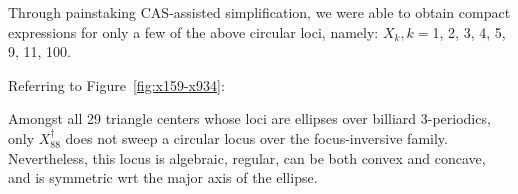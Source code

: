 Through painstaking CAS-assisted simplification, we were able to obtain compact expressions for only a few of the above circular loci, namely: $X_k,k=$1, 2, 3, 4, 5, 9, 11, 100. 

Referring to Figure~\ref{fig:x159-x934}:

\begin{observation}
Amongst all 29 triangle centers whose loci are ellipses over billiard 3-periodics, only $X_{88}^\dagger$ does not sweep a circular locus over the focus-inversive family. Nevertheless, this locus is algebraic, regular, can be both convex and concave, and is symmetric wrt the major axis of the ellipse.
\end{observation}
